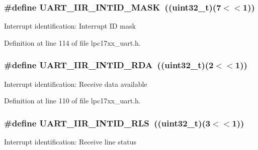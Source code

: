 \subsubsection[{\texorpdfstring{U\+A\+R\+T\+\_\+\+I\+I\+R\+\_\+\+I\+N\+T\+I\+D\+\_\+\+M\+A\+SK}{UART_IIR_INTID_MASK}}]{\setlength{\rightskip}{0pt plus 5cm}\#define U\+A\+R\+T\+\_\+\+I\+I\+R\+\_\+\+I\+N\+T\+I\+D\+\_\+\+M\+A\+SK~(({\bf uint32\+\_\+t})(7$<$$<$1))}\hypertarget{group___u_a_r_t___private___macros_ga6f78952aec5835ac753718323b681910}{}\label{group___u_a_r_t___private___macros_ga6f78952aec5835ac753718323b681910}
Interrupt identification\+: Interrupt ID mask 

Definition at line 114 of file lpc17xx\+\_\+uart.\+h.

\subsubsection[{\texorpdfstring{U\+A\+R\+T\+\_\+\+I\+I\+R\+\_\+\+I\+N\+T\+I\+D\+\_\+\+R\+DA}{UART_IIR_INTID_RDA}}]{\setlength{\rightskip}{0pt plus 5cm}\#define U\+A\+R\+T\+\_\+\+I\+I\+R\+\_\+\+I\+N\+T\+I\+D\+\_\+\+R\+DA~(({\bf uint32\+\_\+t})(2$<$$<$1))}\hypertarget{group___u_a_r_t___private___macros_gac646d8f797f3e71e01f4361997fc581b}{}\label{group___u_a_r_t___private___macros_gac646d8f797f3e71e01f4361997fc581b}
Interrupt identification\+: Receive data available 

Definition at line 110 of file lpc17xx\+\_\+uart.\+h.

\subsubsection[{\texorpdfstring{U\+A\+R\+T\+\_\+\+I\+I\+R\+\_\+\+I\+N\+T\+I\+D\+\_\+\+R\+LS}{UART_IIR_INTID_RLS}}]{\setlength{\rightskip}{0pt plus 5cm}\#define U\+A\+R\+T\+\_\+\+I\+I\+R\+\_\+\+I\+N\+T\+I\+D\+\_\+\+R\+LS~(({\bf uint32\+\_\+t})(3$<$$<$1))}\hypertarget{group___u_a_r_t___private___macros_ga4441660d2a99f6b17a79eafbfb0424dd}{}\label{group___u_a_r_t___private___macros_ga4441660d2a99f6b17a79eafbfb0424dd}
Interrupt identification\+: Receive line status 

